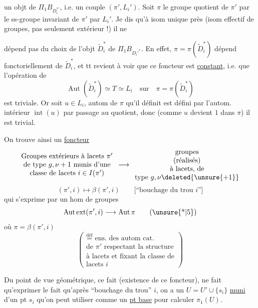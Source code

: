  un objt de \(\Pi_1B_{D_i^{*'}}\), i.e. un couple \((\pi',L_i')\). Soit \(\pi\) le groupe quotient de \(\pi'\) par le ss-groupe invariant de \(\pi'\)   par \(L_i'\). Je dis \margin{\(\Vert\)} qu'à isom unique près (isom effectif de groupes, pas seulement extérieur !) il ne


dépend pas du choix de l'objt \(\widetilde D_i^*\) de \(\Pi_1B_{D_i'^*}\). En effet, \(\pi=\pi(\widetilde D_i^*)\) dépend fonctoriellement de \(\widetilde D_i^*\), et tt revient à voir que ce foncteur est \uline{constant}, i.e. que l'opération de
\[
\operatorname{Aut}(\widetilde D_i^*)\simeq T\simeq L_i
\quad\text{sur}\quad
\pi=\pi(\widetilde D_i^*)
\]
est triviale. Or soit \(u\in L_i\),  autom de \(\pi\) qu'il définit est défini par l'autom. intérieur \(\operatorname{int}(u)\) par passage au quotient, donc (comme \(u\) devient \(1\) dans \(\pi\)) il est trivial. 

On trouve ainsi un \uline{foncteur}
\[
\begin{array}{c}
\text{Groupes extérieurs à lacets }\pi'\\
\text{de type }g,\nu+1\text{ munis d'une}\\
\text{classe de lacets }i\in I(\pi')
\end{array}
\longrightarrow
\begin{array}{c}
\text{groupes}\\
\text{(réalisés)}\\
\text{à lacets, de}\\
\text{type }g,\nu\deleted{\unsure{+1}}
\end{array}
\]
\[
(\pi',i)\longmapsto\beta(\pi',i)
\qquad
\text{[``bouchage du trou \(i\)'']}
\]
qui s'exprime par un hom de groupes
\[
\operatorname{Aut\,ext}(\pi',i)\longrightarrow\operatorname{Aut}\pi
\tag{\unsure{*|5}}
\]
où \(\pi=\beta(\pi',i)\)
\[
\left(
\begin{array}{l}
\overset{\text{déf}}{=}\text{ ens. des autom cat.}\\
\text{de }\pi'\text{ respectant la structure}\\
\text{à lacets et fixant la classe de}\\
\text{lacets }i
\end{array}
\right)
\]


Du point de vue géométrique, ce fait (existence de ce foncteur), ne fait qu'exprimer le fait qu'après ``bouchage du trou'' \(i\), on a un  \(U=U'\cup\{s_i\}\) \uline{muni} d'un pt \(s_i\) qu'on peut utiliser comme un \uline{pt base}  pour calculer \(\pi_1(U)\).

